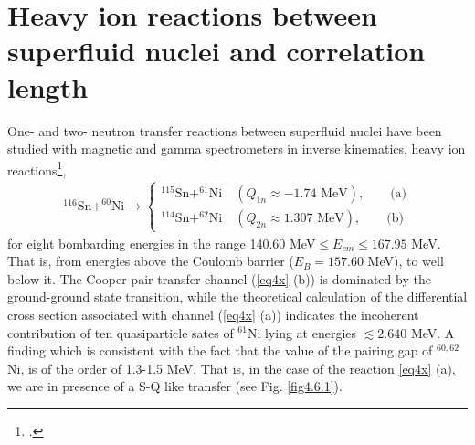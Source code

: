 %
%
%
%
%

\section{Heavy ion reactions between superfluid nuclei and correlation length}\label{S7.3}
One- and two- neutron transfer reactions between superfluid nuclei have been studied with magnetic and gamma spectrometers in inverse kinematics, heavy ion reactions\footnote{\cite{Montanari:14,Montanari:16}.},
\begin{align}\label{eq4x}
^{116}\text{Sn}+^{60}\text{Ni}\to\left\{\begin{array}{c}
^{115}\text{Sn}+^{61}\text{Ni}\quad (Q_{1n}\approx -1.74\text{ MeV}),\quad\quad\text{(a)} \\ [10pt]
^{114}\text{Sn}+^{62}\text{Ni}\quad (Q_{2n}\approx 1.307\text{ MeV}),\quad\quad\text{(b)}
\end{array} \right.
\end{align}
for eight bombarding energies in the range 140.60 MeV$\leq E_{cm}\leq167.95$ MeV. That is, from energies above the Coulomb barrier ($E_B=157.60$ MeV), to well below it. The Cooper pair transfer channel (\ref{eq4x} (b)) is dominated by the ground-ground state transition, while the theoretical calculation of the differential cross section associated with channel (\ref{eq4x} (a)) indicates the incoherent contribution of ten quasiparticle sates of $^{61}$Ni lying at energies $\lesssim 2.640$ MeV. A finding  which is consistent with the fact that the value of the pairing gap of $^{60,62}$Ni, is of the order of 1.3-1.5 MeV. That is, in the case of the reaction \ref{eq4x} (a), we are in presence of a  S-Q like transfer (see Fig. \ref{fig4.6.1}).	
